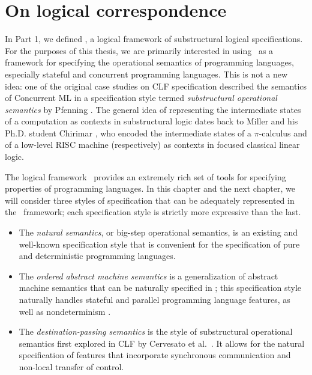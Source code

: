 \chapter{On logical correspondence}

In Part 1, we defined \sls, a logical framework of substructural
logical specifications. For the purposes of this thesis, we are
primarily interested in using \sls~as a framework for specifying the
operational semantics of programming languages, especially stateful
and concurrent programming languages. This is not a new idea: one of
the original case studies on CLF specification described the semantics
of Concurrent ML \cite{cervesato02concurrent} in a specification style
termed {\it substructural operational semantics} by Pfenning
\cite{pfenning04substructural}. The general idea of representing the
intermediate states of a computation as contexts in substructural
logic dates back to Miller \cite{miller92pi} and his Ph.D. student
Chirimar \cite{chirimar95proof}, who encoded the intermediate states
of a $\pi$-calculus and of a low-level RISC machine (respectively) as
contexts in focused classical linear logic.

The logical framework \sls~provides an extremely rich set
of tools for specifying properties of programming languages. In this
chapter and the next chapter, we will consider three styles of
specification that can be adequately represented in the
\sls~framework; each specification style is strictly more expressive
than the last.

\begin{itemize}
\item The {\it natural semantics}, or big-step operational semantics,
  is an existing and well-known specification style that is convenient
  for the specification of pure and deterministic programming
  languages.

\item The {\it ordered abstract machine semantics} is a generalization
  of abstract machine semantics that can be naturally specified in
  \sls; this specification style naturally handles stateful and
  parallel programming language features, as well as nondeterminism
  \cite{pfenning09substructural}.

\item The {\it destination-passing semantics} is the style of
  substructural operational semantics first explored in CLF by
  Cervesato et al.~\cite{cervesato02concurrent}. It allows for the
  natural specification of features that incorporate synchronous
  communication and non-local transfer of control.
\end{itemize}

